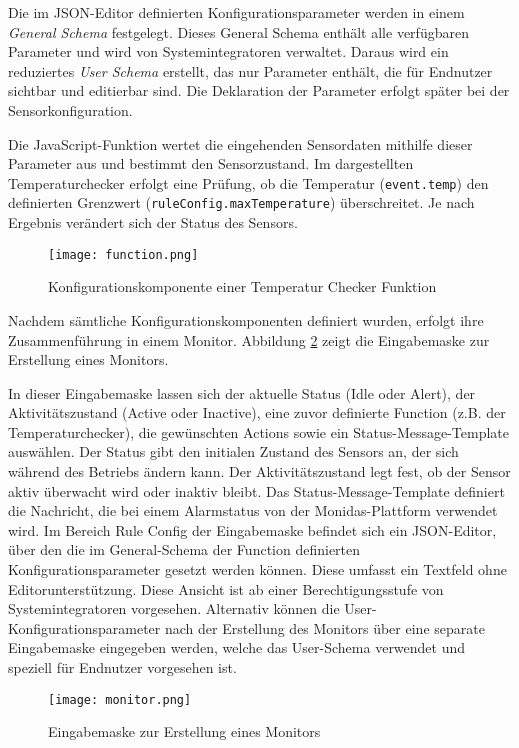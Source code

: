 Die im JSON-Editor definierten Konfigurationsparameter werden in einem \textit{General Schema} festgelegt. Dieses General Schema enthält alle verfügbaren Parameter und wird von Systemintegratoren verwaltet. Daraus wird ein reduziertes \textit{User Schema} erstellt, das nur Parameter enthält, die für Endnutzer sichtbar und editierbar sind. Die Deklaration der Parameter erfolgt später bei der Sensorkonfiguration.

Die JavaScript-Funktion wertet die eingehenden Sensordaten mithilfe dieser Parameter aus und bestimmt den Sensorzustand. Im dargestellten Temperaturchecker erfolgt eine Prüfung, ob die Temperatur (\texttt{event.temp}) den definierten Grenzwert (\texttt{ruleConfig.maxTemperature}) überschreitet. Je nach Ergebnis verändert sich der Status des Sensors.


\begin{figure}[H]
  \centering
  \texttt{[image: function.png]}
  \caption{Konfigurationskomponente einer Temperatur Checker Funktion}
  \label{fig:function}
\end{figure}

Nachdem sämtliche Konfigurationskomponenten definiert wurden, erfolgt ihre Zusammenführung in einem Monitor. Abbildung \ref{fig:monitor} zeigt die Eingabemaske zur Erstellung eines Monitors.

In dieser Eingabemaske lassen sich der aktuelle Status (Idle oder Alert), der Aktivitätszustand (Active oder Inactive), eine zuvor definierte Function (z.B. der Temperaturchecker), die gewünschten Actions sowie ein Status-Message-Template auswählen. Der Status gibt den initialen Zustand des Sensors an, der sich während des Betriebs ändern kann. Der Aktivitätszustand legt fest, ob der Sensor aktiv überwacht wird oder inaktiv bleibt. Das Status-Message-Template definiert die Nachricht, die bei einem Alarmstatus von der Monidas-Plattform verwendet wird. Im Bereich Rule Config der Eingabemaske befindet sich ein JSON-Editor, über den die im General-Schema der Function definierten Konfigurationsparameter gesetzt werden können. Diese umfasst ein Textfeld ohne Editorunterstützung. Diese Ansicht ist ab einer Berechtigungsstufe von Systemintegratoren vorgesehen. Alternativ können die User-Konfigurationsparameter nach der Erstellung des Monitors über eine separate Eingabemaske eingegeben werden, welche das User-Schema verwendet und speziell für Endnutzer vorgesehen ist.

\begin{figure}[H]
  \centering
  \texttt{[image: monitor.png]}
  \caption{Eingabemaske zur Erstellung eines Monitors}
  \label{fig:monitor}
\end{figure}

